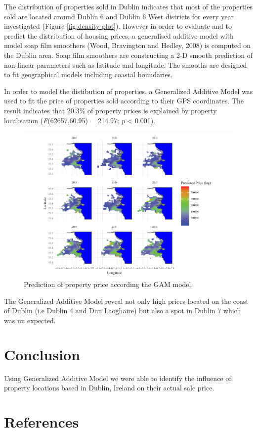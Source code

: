 \documentclass[]{elsarticle} %
\begin{document}
The distribution of properties sold in Dublin indicates that most of the
properties sold are located around Dublin 6 and Dublin 6 West districts
for every year investigated (Figure \ref{fig:density-plot}). However in
order to evaluate and to predict the distribution of housing prices, a
generalised additive model with model soap film smoothers (Wood,
Bravington and Hedley, 2008) is computed on the Dublin area. Soap film
smoothers are constructing a 2-D smooth prediction of non-linear
parameters such as latitude and longitude. The smooths are designed to
fit geographical models including coastal boundaries.

In order to model the distibution of properties, a Generalized Additive
Model was used to fit the price of properties sold according to their
GPS coordinates. The result indicates that 20.3\% of property prices is
explained by property localisation (\emph{F}(62657,60.95) = 214.97;
\emph{p} \textless{} 0.001).

\begin{figure}[H]

\includegraphics{property_price_paper_new_files/figure-latex/gam-plot-1} \hfill{}

\caption{Prediction of property price according the GAM model.}\label{fig:gam-plot}
\end{figure}

The Generalized Additive Model reveal not only high prices located on
the coast of Dublin (i.e Dublin 4 and Dun Laoghaire) but also a spot in
Dublin 7 which was un expected.

\section{Conclusion}\label{conclusion}

Using Generalized Additive Model we were able to identify the influence
of property locations based in Dublin, Ireland on their actual sale
price.

\section*{References}\label{references}
\end{document}
